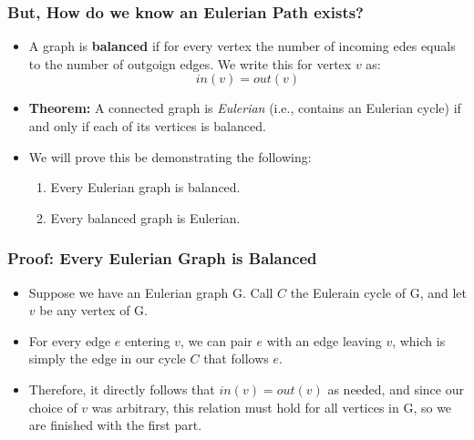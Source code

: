 \documentclass[10pt]{article}
\begin{document}
\subsubsection*{But, How do we know an Eulerian Path exists?}
\begin{itemize}
    \item A graph is \textbf{balanced} if for every vertex the number of incoming edes equals to the number of outgoign edges.  We write this for vertex $v$ as:
    \[in(v) = out(v)\]
    \item \textbf{Theorem:} A connected graph is \textit{Eulerian} (i.e., contains an Eulerian cycle) if and only if each of its vertices is balanced.
    \item We will prove this be demonstrating the following:
    \begin{enumerate}
        \item Every Eulerian graph is balanced.
        \item Every balanced graph is Eulerian.
    \end{enumerate}
\end{itemize}

\subsubsection*{Proof: Every Eulerian Graph is Balanced}
\begin{itemize}
    \item Suppose we have an Eulerian graph G.  Call $C$ the Eulerain cycle of G, and let $v$ be any vertex of G.
    \item For every edge $e$ entering $v$, we can pair $e$ with an edge leaving $v$, which is simply the edge in our cycle $C$ that follows $e$.
    \item Therefore, it directly follows that $in(v) = out(v)$ as needed, and since our choice of $v$ was arbitrary, this relation must hold for all vertices in G, so we are finished with the first part.
\end{itemize}
\end{document}
